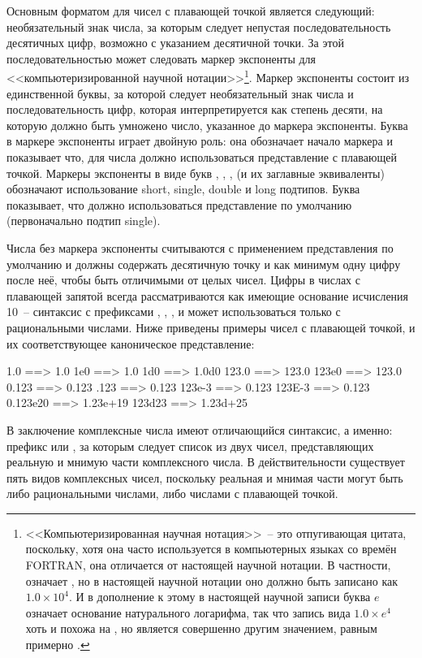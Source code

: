 Основным форматом для чисел с плавающей точкой является следующий: необязательный знак
числа, за которым следует непустая последовательность десятичных цифр, возможно с
указанием десятичной точки.  За этой последовательностью может следовать маркер экспоненты
для <<компьютеризированной научной нотации>>\footnote{<<Компьютеризированная научная
  нотация>>~-- это отпугивающая цитата, поскольку, хотя она часто используется в
  компьютерных языках со времён FORTRAN, она отличается от настоящей научной нотации.  В
  частности,  означает , но в настоящей научной нотации оно
  должно быть записано как $1.0 \times 10^4$.  И в дополнение к этому в настоящей научной
  записи буква $e$ означает основание натурального логарифма, так что запись вида
  $1.0 \times e^4$ хоть и похожа на , но является совершенно другим
  значением, равным примерно .}.  Маркер экспоненты состоит из единственной
буквы, за которой следует необязательный знак числа и последовательность цифр, которая
интерпретируется как степень десяти, на которую должно быть умножено число, указанное до
маркера экспоненты.  Буква в маркере экспоненты играет двойную роль: она обозначает начало
маркера и показывает что, для числа должно использоваться представление с плавающей
точкой.  Маркеры экспоненты в виде букв , , ,  (и их
заглавные эквиваленты) обозначают использование short, single, double и long подтипов.
Буква  показывает, что должно использоваться представление по умолчанию
(первоначально подтип single).

Числа без маркера экспоненты считываются с применением представления по умолчанию и
должны содержать десятичную точку и как минимум одну цифру после неё, чтобы быть отличимыми
от целых чисел.  Цифры в числах с плавающей запятой всегда рассматриваются как имеющие
основание исчисления 10~-- синтаксис с префиксами , , , и
 может использоваться только с рациональными числами.  Ниже приведены примеры
чисел с плавающей точкой, и их соответствующее каноническое представление:

\begin{myverb}
  1.0      ==> 1.0
  1e0      ==> 1.0
  1d0      ==> 1.0d0
  123.0    ==> 123.0
  123e0    ==> 123.0
  0.123    ==> 0.123
  .123     ==> 0.123
  123e-3   ==> 0.123
  123E-3   ==> 0.123
  0.123e20 ==> 1.23e+19
  123d23   ==> 1.23d+25
\end{myverb}

В заключение комплексные числа имеют отличающийся синтаксис, а именно: префикс 
или , за которым следует список из двух чисел, представляющих реальную и мнимую
части комплексного числа.  В действительности существует пять видов комплексных чисел,
поскольку реальная и мнимая части могут быть либо рациональными числами, либо числами с
плавающей точкой.

